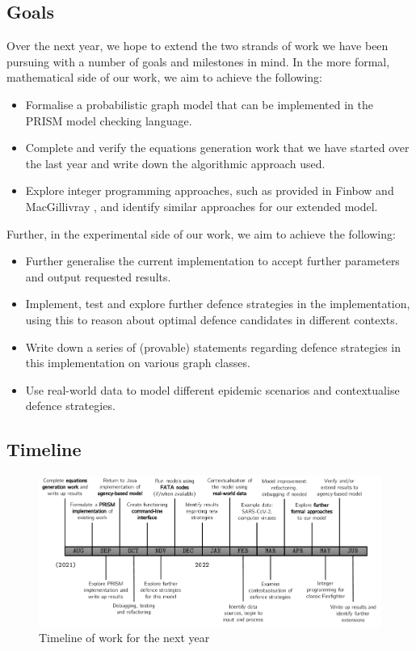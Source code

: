 \documentclass[../report.tex]{subfiles}
\begin{document}
\subsection{Goals}

Over the next year, we hope to extend the two strands of work we have been pursuing with a number of goals and milestones in mind. In the more formal, mathematical side of our work, we aim to achieve the following:
\begin{itemize}
	\item Formalise a probabilistic graph model that can be implemented in the PRISM model checking language.
	\item Complete and verify the equations generation work that we have started over the last year and write down the algorithmic approach used.
	\item Explore integer programming approaches, such as provided in Finbow and MacGillivray \cite{finbow_2009}, and identify similar approaches for our extended model.
\end{itemize}
Further, in the experimental side of our work, we aim to achieve the following:
\begin{itemize}
	\item Further generalise the current implementation to accept further parameters and output requested results.
	\item Implement, test and explore further defence strategies in the implementation, using this to reason about optimal defence candidates in different contexts.
	\item Write down a series of (provable) statements regarding defence strategies in this implementation on various graph classes.
	\item Use real-world data to model different epidemic scenarios and contextualise defence strategies.
\end{itemize}

\subsection{Timeline}

\begin{figure}[!ht]
\centering\includegraphics[width=\textwidth]{assets/timeline}
\caption{Timeline of work for the next year}
\end{figure}
\end{document}
